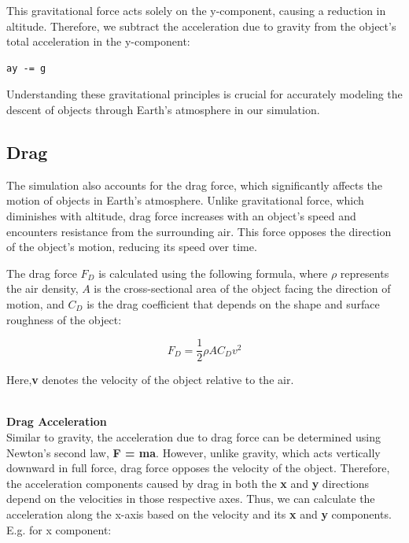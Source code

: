\documentclass[runningheads]{llncs}
\begin{document}
This gravitational force acts solely on the y-component, causing a reduction in altitude. Therefore, we subtract the acceleration due to gravity from the object's total acceleration in the y-component:

\begin{verbatim}
ay -= g
\end{verbatim}

Understanding these gravitational principles is crucial for accurately modeling the descent of objects through Earth's atmosphere in our simulation.




\subsection{Drag}
The simulation also accounts for the drag force, which significantly affects the motion of objects in Earth's atmosphere. Unlike gravitational force, which diminishes with altitude, drag force increases with an object's speed and encounters resistance from the surrounding air. This force opposes the direction of the object's motion, reducing its speed over time.

The drag force \( F_D \) is calculated using the following formula, where \( \rho \) represents the air density, \( A \) is the cross-sectional area of the object facing the direction of motion, and \( C_D \) is the drag coefficient that depends on the shape and surface roughness of the object:

\begin{equation}
F_D = \frac{1}{2} \rho A C_D v^2 
\end{equation}

Here,\textbf{v} denotes the velocity of the object relative to the air.

\textbf{\\Drag Acceleration\\}
Similar to gravity, the acceleration due to drag force can be determined using Newton's second law, 
\textbf{F = ma}. However, unlike gravity, which acts vertically downward in full force, drag force opposes the velocity of the object. Therefore, the acceleration components caused by drag in both the \textbf{x} and \textbf{y} directions depend on the velocities in those respective axes.
Thus, we can calculate the acceleration along the x-axis based on the velocity and its \textbf{x} and \textbf{y} components. E.g. for x component:
\end{document}
